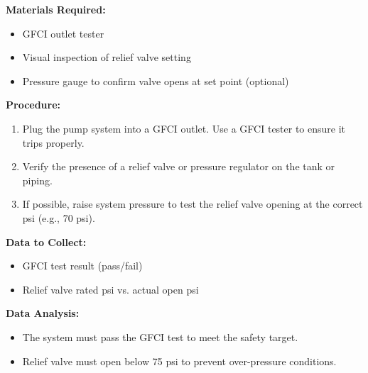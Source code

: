 \documentclass[12pt]{article}
\begin{document}
\noindent
\textbf{Materials Required:}
\begin{itemize}
    \item GFCI outlet tester
    \item Visual inspection of relief valve setting
    \item Pressure gauge to confirm valve opens at set point (optional)
\end{itemize}

\noindent
\textbf{Procedure:}
\begin{enumerate}
    \item Plug the pump system into a GFCI outlet. Use a GFCI tester to ensure it trips properly.
    \item Verify the presence of a relief valve or pressure regulator on the tank or piping.
    \item If possible, raise system pressure to test the relief valve opening at the correct psi (e.g., 70 psi).
\end{enumerate}

\noindent
\textbf{Data to Collect:}
\begin{itemize}
    \item GFCI test result (pass/fail)
    \item Relief valve rated psi vs. actual open psi
\end{itemize}

\noindent
\textbf{Data Analysis:}
\begin{itemize}
    \item The system must pass the GFCI test to meet the safety target.
    \item Relief valve must open below 75 psi to prevent over-pressure conditions.
\end{itemize}


\end{document}

